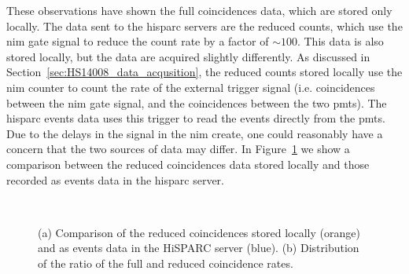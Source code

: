 These observations have shown the full coincidences data, which are stored only locally. The data sent to the \gls{hisparc} servers are the reduced counts, which use the \gls{nim} gate signal to reduce the count rate by a factor of $\sim 100$. This data is also stored locally, but the data are acquired slightly differently. As discussed in Section~\ref{sec:HS14008_data_acqusition}, the reduced counts stored locally use the \gls{nim} counter to count the rate of the external trigger signal (i.e. coincidences between the \gls{nim} gate signal, and the coincidences between the two \glspl{pmt}). The \gls{hisparc} events data uses this trigger to read the events directly from the \glspl{pmt}. Due to the delays in the signal in the \gls{nim} create, one could reasonably have a concern that the two sources of data may differ. In Figure~\ref{fig:reduced_coincidences} we show a comparison between the reduced coincidences data stored locally and those recorded as events data in the \gls{hisparc} server.


\begin{figure}[ht!]
	\centering
	 \\
	
	\caption{(a) Comparison of the reduced coincidences stored locally (orange) and as events data in the HiSPARC server (blue). (b) Distribution of the ratio of the full and reduced coincidence rates.}
	\label{fig:reduced_coincidences}
\end{figure}

